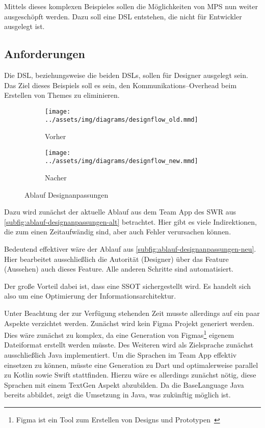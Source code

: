 Mittels dieses komplexen Beispieles sollen die Möglichkeiten von \ac{MPS} nun weiter ausgeschöpft werden.
Dazu soll eine \ac{DSL} entstehen, die nicht für Entwickler ausgelegt ist.

\subsection{Anforderungen}\label{subsec:anforderungen}
Die \ac{DSL}, beziehungsweise die beiden \acp{DSL}, sollen für Designer ausgelegt sein.
Das Ziel dieses Beispiels soll es sein, den Kommunikations--Overhead beim Erstellen von Themes zu eliminieren.
\begin{figure}[ht]
    \begin{subfigure}[c]{0.5\textwidth}
        \begin{center}
            \texttt{[image: ../assets/img/diagrams/designflow\_old.mmd]}
        \end{center}
        \caption{Vorher}
        \label{subfig:ablauf-designanpassungen-alt}
    \end{subfigure}
    \begin{subfigure}[c]{0.5\textwidth}
        \begin{center}
            \texttt{[image: ../assets/img/diagrams/designflow\_new.mmd]}
        \end{center}
        \caption{Nacher}
        \label{subfig:ablauf-designanpassungen-neu}
    \end{subfigure}
    \caption{Ablauf Designanpassungen}
    \label{fig:ablauf-designanpassungen}
\end{figure}

Dazu wird zunächst der aktuelle Ablauf aus dem Team App des \ac{SWR} aus \autoref{subfig:ablauf-designanpassungen-alt} betrachtet.
Hier gibt es viele Indirektionen, die zum einen Zeitaufwändig sind, aber auch Fehler verursachen können.

Bedeutend effektiver wäre der Ablauf aus \autoref{subfig:ablauf-designanpassungen-neu}.
Hier bearbeitet ausschließlich die Autorität (Designer) über das Feature (Aussehen) auch dieses Feature.
Alle anderen Schritte sind automatisiert.

Der große Vorteil dabei ist, dass eine \ac{SSOT} sichergestellt wird.
Es handelt sich also um eine Optimierung der Informationsarchitektur.

Unter Beachtung der zur Verfügung stehenden Zeit musste allerdings auf ein paar Aspekte verzichtet werden.
Zunächst wird kein Figma Projekt generiert werden.
Dies wäre zunächst zu komplex, da eine Generation von Figmas\footnote{Figma ist ein Tool zum Erstellen von Designs und Prototypen~\autocite{figma-inc-no-date}} eigenem Dateiformat erstellt werden müsste.
Des Weiteren wird als Zielsprache zunächst ausschließlich Java implementiert.
Um die Sprachen im Team App effektiv einsetzen zu können, müsste eine Generation zu Dart und optimalerweise parallel zu Kotlin sowie Swift stattfinden.
Hierzu wäre es allerdings zunächst nötig, diese Sprachen mit einem TextGen Aspekt abzubilden.
Da die BaseLanguage Java bereits abbildet, zeigt die Umsetzung in Java, was zukünftig möglich ist.

